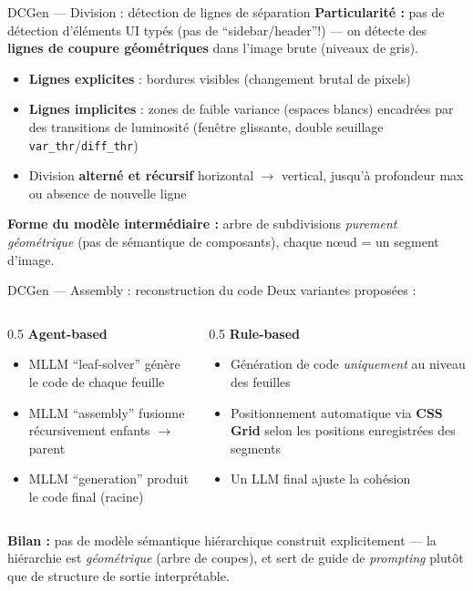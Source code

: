 \documentclass[10pt,aspectratio=169]{beamer}
\begin{document}
\begin{frame}{DCGen --- Division : détection de lignes de séparation}
\textbf{Particularité :} pas de détection d'éléments UI typés (pas de ``sidebar/header''!) — on détecte des \textbf{lignes de coupure géométriques} dans l'image brute (niveaux de gris).

\begin{itemize}
  \item \textbf{Lignes explicites} : bordures visibles (changement brutal de pixels)
  \item \textbf{Lignes implicites} : zones de faible variance (espaces blancs) encadrées par des transitions de luminosité (fenêtre glissante, double seuillage \texttt{var\_thr}/\texttt{diff\_thr})
  \item Division \textbf{alterné et récursif} horizontal $\to$ vertical, jusqu'à profondeur max ou absence de nouvelle ligne
\end{itemize}

\textbf{Forme du modèle intermédiaire :} arbre de subdivisions \emph{purement géométrique} (pas de sémantique de composants), chaque n\oe ud = un segment d'image.
\end{frame}

\begin{frame}{DCGen --- Assembly : reconstruction du code}
Deux variantes proposées :
\begin{columns}
\begin{column}{0.5\textwidth}
\textbf{Agent-based}
\begin{itemize}
  \item MLLM ``leaf-solver'' génère le code de chaque feuille
  \item MLLM ``assembly'' fusionne récursivement enfants $\to$ parent
  \item MLLM ``generation'' produit le code final (racine)
\end{itemize}
\end{column}
\begin{column}{0.5\textwidth}
\textbf{Rule-based}
\begin{itemize}
  \item Génération de code \emph{uniquement} au niveau des feuilles
  \item Positionnement automatique via \textbf{CSS Grid} selon les positions enregistrées des segments
  \item Un LLM final ajuste la cohésion
\end{itemize}
\end{column}
\end{columns}
\vspace{2mm}
\textbf{Bilan :} pas de modèle sémantique hiérarchique construit explicitement — la hiérarchie est \emph{géométrique} (arbre de coupes), et sert de guide de \emph{prompting} plutôt que de structure de sortie interprétable.
\end{frame}
\end{document}
